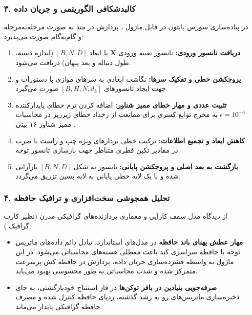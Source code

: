 \subsubsection*{۳. کالبدشکافی الگوریتمی و جریان داده }
در پیاده‌سازی سورس پایتون در فایل ماژول ، پردازش در متد  به صورت مرحله‌به‌مرحله و گام‌به‌گام صورت می‌پذیرد:
\begin{enumerate}
\item \textbf{دریافت تانسور ورودی:} تانسور تعبیه ورودی $\mathbf{X}$ با ابعاد $[B, N, D]$ (اندازه دسته، طول دنباله و بعد پنهان) دریافت می‌شود.
\item \textbf{پروجکشن خطی و تفکیک سرها:} نگاشت ابعادی به سرهای موازی با دستورات  و  جهت ایجاد تانسورهای $[B, H, N, d_k]$ صورت می‌گیرد.
\item \textbf{تثبیت عددی و مهار خطای ممیز شناور:} اضافه کردن ترم خطای پایدارکننده $\epsilon = 10^{-6}$ به مخرج توابع کسری برای ممانعت از رخداد خطای زیرریز  در محاسبات ممیز شناور ۱۶ بیتی .
\item \textbf{کاهش ابعاد و تجمیع اطلاعات:} ترکیب خطی بردارهای ویژه چپ و راست با ضرب در مقادیر تکین قطری متناظر جهت بازسازی تانسور توجه.
\item \textbf{بازگشت به بعد اصلی و پروجکشن پایانی:} تانسور به شکل $[B, N, D]$ بازآرایی شده و با یک لایه خطی پایانی به لایه پسین تزریق می‌گردد.
\end{enumerate}

\subsubsection*{۴. تحلیل همجوشی سخت‌افزاری و ترافیک حافظه }
از دیدگاه مدل سقف کارایی  و معماری پردازنده‌های گرافیکی مدرن (نظیر کارت گرافیک ):
\begin{itemize}
\item \textbf{مهار عطش پهنای باند حافظه } \rl{:}  در مدل‌های استاندارد، تبادل دائم داده‌های ماتریس توجه با حافظه سراسری کند  باعث معطلی هسته‌های محاسباتی می‌شود. در این ماژول به واسطه فشرده‌سازی جریان داده، پردازش در حافظه کش پرسرعت  متمرکز شده و شدت محاسباتی  به طور محسوسی بهبود می‌یابد.
\item \textbf{صرفه‌جویی بنیادین در بافر توکن‌ها } \rl{:}  در فاز استنتاج خودبازگشتی، به جای ذخیره‌سازی ماتریس‌های رو به رشد گذشته، ردپای حافظه کنترل شده و مصرف حافظه گرافیکی پایدار می‌ماند.
\end{itemize}

